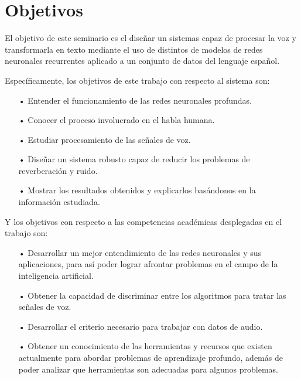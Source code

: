 
\section{Objetivos}

El objetivo de este seminario es el diseñar un sistemas capaz de procesar la voz y transformarla en texto mediante el uso de distintos de modelos de redes neuronales recurrentes aplicado a un conjunto de datos del lenguaje español.

Específicamente, los objetivos de este trabajo con respecto al sistema son:

\begin{itemize}
\item[•] Entender el funcionamiento de las redes neuronales profundas.%
\item[•] Conocer el proceso involucrado en el habla humana.
\item[•] Estudiar procesamiento de las señales de voz.

\item[•] Diseñar un sistema robusto capaz de reducir los problemas de reverberación y ruido.
\item[•] Mostrar los resultados obtenidos y explicarlos basándonos en la información estudiada.



\end{itemize}

Y los objetivos con respecto a las competencias académicas desplegadas en el trabajo son:
\begin{itemize}
\item[•] Desarrollar un mejor entendimiento de las redes neuronales y sus aplicaciones, para así poder lograr afrontar problemas en el campo de la inteligencia artificial. %
\item[•] Obtener la capacidad de discriminar entre los algoritmos para tratar las señales de voz.%
\item[•] Desarrollar el criterio necesario para trabajar con datos de audio.
\item[•] Obtener un conocimiento de las herramientas y recursos que existen actualmente para abordar problemas de aprendizaje profundo, además de poder analizar que herramientas son adecuadas para algunos problemas.

\end{itemize}

